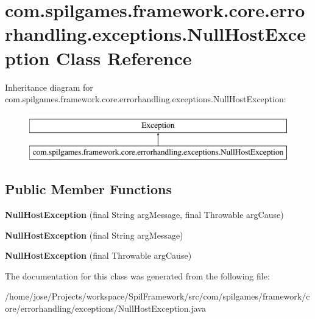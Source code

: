 \hypertarget{classcom_1_1spilgames_1_1framework_1_1core_1_1errorhandling_1_1exceptions_1_1_null_host_exception}{\section{com.\-spilgames.\-framework.\-core.\-errorhandling.\-exceptions.\-Null\-Host\-Exception Class Reference}
\label{classcom_1_1spilgames_1_1framework_1_1core_1_1errorhandling_1_1exceptions_1_1_null_host_exception}
}
Inheritance diagram for com.\-spilgames.\-framework.\-core.\-errorhandling.\-exceptions.\-Null\-Host\-Exception\-:\begin{figure}[H]
\begin{center}
\leavevmode
\includegraphics[height=2.000000cm]{classcom_1_1spilgames_1_1framework_1_1core_1_1errorhandling_1_1exceptions_1_1_null_host_exception}
\end{center}
\end{figure}
\subsection*{Public Member Functions}
\begin{DoxyCompactItemize}
\item 
\hypertarget{classcom_1_1spilgames_1_1framework_1_1core_1_1errorhandling_1_1exceptions_1_1_null_host_exception_a3b42ead257ac2cb4be495b3ba68867d0}{{\bfseries Null\-Host\-Exception} (final String arg\-Message, final Throwable arg\-Cause)}\label{classcom_1_1spilgames_1_1framework_1_1core_1_1errorhandling_1_1exceptions_1_1_null_host_exception_a3b42ead257ac2cb4be495b3ba68867d0}

\item 
\hypertarget{classcom_1_1spilgames_1_1framework_1_1core_1_1errorhandling_1_1exceptions_1_1_null_host_exception_acd5e098528425b5d9496e903a5efa460}{{\bfseries Null\-Host\-Exception} (final String arg\-Message)}\label{classcom_1_1spilgames_1_1framework_1_1core_1_1errorhandling_1_1exceptions_1_1_null_host_exception_acd5e098528425b5d9496e903a5efa460}

\item 
\hypertarget{classcom_1_1spilgames_1_1framework_1_1core_1_1errorhandling_1_1exceptions_1_1_null_host_exception_adea0c721cb77b91418a10112627eabcb}{{\bfseries Null\-Host\-Exception} (final Throwable arg\-Cause)}\label{classcom_1_1spilgames_1_1framework_1_1core_1_1errorhandling_1_1exceptions_1_1_null_host_exception_adea0c721cb77b91418a10112627eabcb}

\end{DoxyCompactItemize}


The documentation for this class was generated from the following file\-:\begin{DoxyCompactItemize}
\item 
/home/jose/\-Projects/workspace/\-Spil\-Framework/src/com/spilgames/framework/core/errorhandling/exceptions/Null\-Host\-Exception.\-java\end{DoxyCompactItemize}
